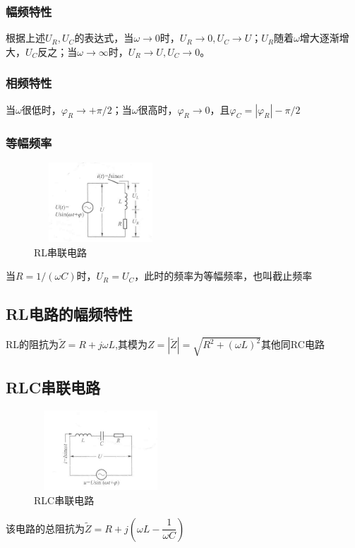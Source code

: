 \fancypage{\fbox}{}
\subsubsection{幅频特性}
根据上述$U_R,U_C$的表达式，当$\omega \rightarrow 0$时，$U_R\rightarrow 0,U_C\rightarrow U$；$U_R$随着$\omega$增大逐渐增大，$U_C$反之；当$\omega \rightarrow \infty$时，$U_R\rightarrow U,U_C\rightarrow 0$。
\subsubsection{相频特性}
当$\omega$很低时，$\varphi_R→+\pi/2$；当$\omega$很高时，$\varphi_R→0$，且$\varphi_C=|\varphi_R|-\pi/2$
\subsubsection{等幅频率}
\begin{figure} %
	\centering
	\includegraphics[height=3cm,width=5cm]{figure/2.png}
    \caption*{RL串联电路}
\end{figure}
当$R=1/(\omega C)$时，$U_R=U_C$，此时的频率为等幅频率，也叫截止频率
\subsection{RL电路的幅频特性}
RL的阻抗为$\tilde{Z}=R+j\omega L$,其模为$Z=|\tilde{Z}|=\sqrt{R^2+(\omega L)^2}$其他同RC电路
\subsection{RLC串联电路}
\begin{figure} %
	\centering
	\includegraphics[height=3cm,width=5cm]{figure/3.png}
    \caption*{RLC串联电路}
\end{figure}
该电路的总阻抗为$\tilde{Z}=R+j\left(\omega L-\dfrac{1}{\omega C}\right)$

